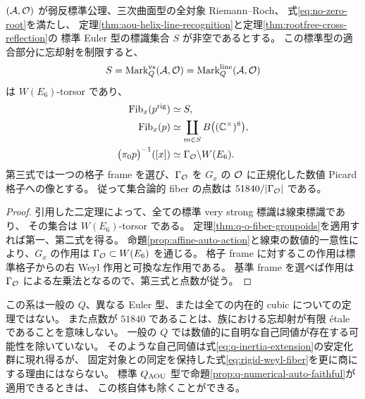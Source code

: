 \begin{corollary}
\label{cor:standard-q-o-weyl-fibers}
$(\mathcal A,\mathcal O)$ が弱反標準公理、三次曲面型の全対象 Riemann--Roch、
式\eqref{eq:no-zero-root}を満たし、
定理\ref{thm:aou-helix-line-recognition}と定理\ref{thm:rootfree-cross-reflection}の
標準 Euler 型の標識集合 $S$ が非空であるとする。
この標準型の適合部分に忘却射を制限すると、
\[
 S=\operatorname{Mark}^{\mathrm{vs}}_Q(\mathcal A,\mathcal O)
  =\operatorname{Mark}^{\mathrm{line}}_Q(\mathcal A,\mathcal O)
\]
は $W(E_6)$-torsor であり、
\begin{align}
 \operatorname{Fib}_x(p^{\mathrm{rig}})&\simeq S,
 \label{eq:rigid-weyl-fiber}\\
 \operatorname{Fib}_x(p)&\simeq
   \coprod_{m\in S}B\bigl((\mathbb C^\times)^8\bigr),
 \label{eq:raw-weyl-fiber}\\
 \bigl(\pi_0p\bigr)^{-1}([x])&\simeq\Gamma_{\mathcal O}\backslash W(E_6).
 \label{eq:set-weyl-fiber}
\end{align}
第三式では一つの格子 frame を選び、$\Gamma_{\mathcal O}$ を
$G_x$ の $\mathcal O$ に正規化した数値 Picard 格子への像とする。
従って集合論的 fiber の点数は $51840/|\Gamma_{\mathcal O}|$ である。
\end{corollary}
\begin{proof}
引用した二定理によって、全ての標準 very strong 標識は線束標識であり、
その集合は $W(E_6)$-torsor である。
定理\ref{thm:q-o-fiber-groupoids}を適用すれば第一、第二式を得る。
命題\ref{prop:affine-auto-action}と線束の数値的一意性により、$G_x$ の作用は
$\Gamma_{\mathcal O}\subset W(E_6)$ を通じる。
格子 frame に対するこの作用は標準格子からの右 Weyl 作用と可換な左作用である。
基準 frame を選べば作用は $\Gamma_{\mathcal O}$ による左乗法となるので、第三式と点数が従う。
\end{proof}

この系は一般の $Q$、異なる Euler 型、または全ての内在的 cubic についての定理ではない。
また点数が $51840$ であることは、族における忘却射が有限 \'etale であることを意味しない。
一般の $Q$ では数値的に自明な自己同値が存在する可能性を除いていない。
そのような自己同値は式\eqref{eq:q-inertia-extension}の安定化群に現れ得るが、
固定対象との同定を保持した式\eqref{eq:rigid-weyl-fiber}を更に商にする理由にはならない。
標準 $Q_{\rm AOU}$ 型で命題\ref{prop:q-numerical-auto-faithful}が適用できるときは、
この核自体も除くことができる。

